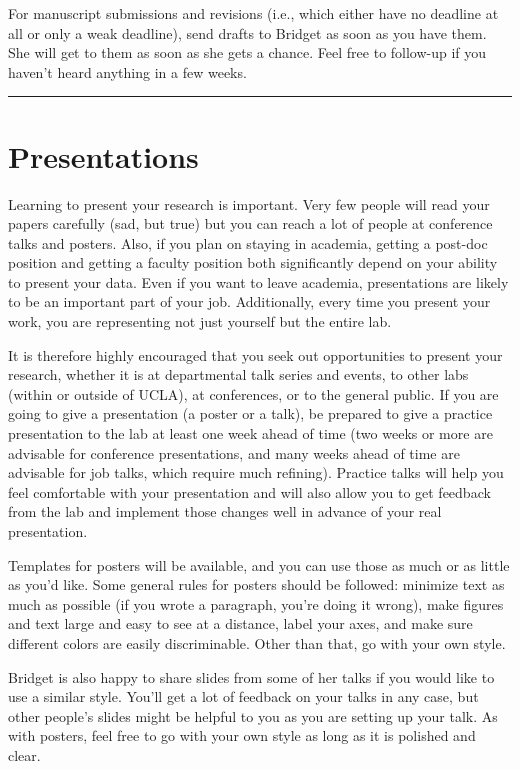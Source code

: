 \documentclass[
]{book}
\begin{document}
For manuscript submissions and revisions (i.e., which either have no deadline at all or only a weak deadline), send drafts to Bridget as soon as you have them. She will get to them as soon as she gets a chance. Feel free to follow-up if you haven't heard anything in a few weeks.

\begin{center}\rule{0.5\linewidth}{0.5pt}\end{center}

\hypertarget{presentations}{%
\section{Presentations}\label{presentations}}

Learning to present your research is important. Very few people will read your papers carefully (sad, but true) but you can reach a lot of people at conference talks and posters. Also, if you plan on staying in academia, getting a post-doc position and getting a faculty position both significantly depend on your ability to present your data. Even if you want to leave academia, presentations are likely to be an important part of your job. Additionally, every time you present your work, you are representing not just yourself but the entire lab.

It is therefore highly encouraged that you seek out opportunities to present your research, whether it is at departmental talk series and events, to other labs (within or outside of UCLA), at conferences, or to the general public. If you are going to give a presentation (a poster or a talk), be prepared to give a practice presentation to the lab at least one week ahead of time (two weeks or more are advisable for conference presentations, and many weeks ahead of time are advisable for job talks, which require much refining). Practice talks will help you feel comfortable with your presentation and will also allow you to get feedback from the lab and implement those changes well in advance of your real presentation.

Templates for posters will be available, and you can use those as much or as little as you'd like. Some general rules for posters should be followed: minimize text as much as possible (if you wrote a paragraph, you're doing it wrong), make figures and text large and easy to see at a distance, label your axes, and make sure different colors are easily discriminable. Other than that, go with your own style.

Bridget is also happy to share slides from some of her talks if you would like to use a similar style. You'll get a lot of feedback on your talks in any case, but other people's slides might be helpful to you as you are setting up your talk. As with posters, feel free to go with your own style as long as it is polished and clear.
\end{document}
